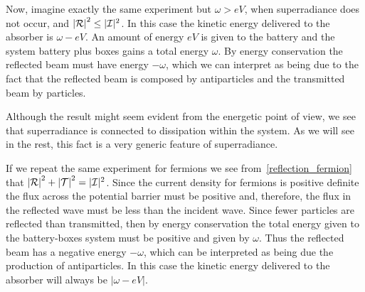 \documentclass[11pt]{article}
\numberwithin{equation}{section} %
\begin{document}
Now, imagine exactly the same experiment but $\omega>eV$, when superradiance does not occur, and $\left|\mathcal{R}\right|^2\leq |{\cal I}|^2$. In this case the kinetic energy delivered to the absorber is $\omega-eV$. An amount of energy $eV$ is given to the battery and the system battery plus boxes gains a total energy $\omega$. By energy conservation the reflected beam must have energy $-\omega$, which we can interpret as being due to the fact that the reflected beam is composed by antiparticles and the transmitted beam by particles.

Although the result might seem evident from the energetic point of view, we see that superradiance is connected to dissipation within the system. As we will see in the rest, this fact is a very generic feature of superradiance.

If we repeat the same experiment for fermions we see from~\eqref{reflection_fermion} that $\left|\mathcal{R}\right|^2+\left|\mathcal{T}\right|^2=|{\cal I}|^2$.
Since the current density for fermions is positive definite the flux across the potential barrier must be positive and, therefore, the flux in the reflected wave must be less than the incident wave. Since fewer particles are reflected than transmitted, then by energy conservation the total energy given to the battery-boxes system must be positive and given by $\omega$. Thus the reflected beam has a negative energy $-\omega$, which can be interpreted as being due the production of antiparticles. In this case the kinetic energy delivered to the absorber will always be $|\omega-eV|$.  
\end{document}
